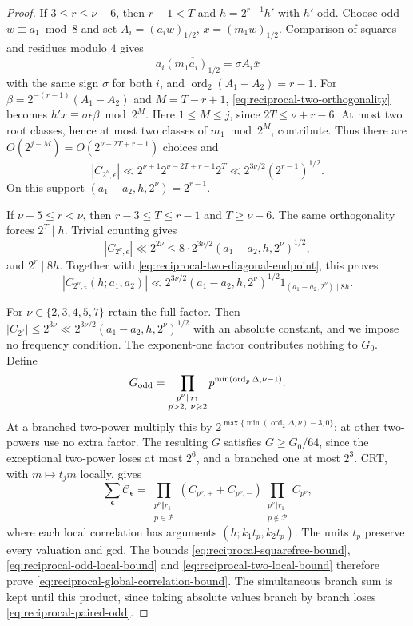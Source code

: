 \documentclass[12pt, a4paper]{amsart}
\numberwithin{equation}{section}
\renewcommand{\bar}[1]{\overline{#1}}
\renewcommand{\le}{\leqslant}
\renewcommand{\ge}{\geqslant}
\theoremstyle{plain}
\begin{document}
\begin{proof}
 If $3\le r\le\nu-6$, then $r-1<T$ and $h=2^{r-1}h'$ with $h'$ odd. Choose odd $w\equiv a_1\bmod8$ and set $A_i=(a_iw)_{1/2}$, $x=(m_1w)_{1/2}$. Comparison of squares and residues modulo $4$ gives
$$
a_i\overline{(m_1a_i)_{1/2}}=\sigma A_i\bar x
$$
with the same sign $\sigma$ for both $i$, and $\operatorname{ord}_2(A_1-A_2)=r-1$. For $\beta=2^{-(r-1)}(A_1-A_2)$ and $M=T-r+1$, \eqref{eq:reciprocal-two-orthogonality} becomes $h'x\equiv\sigma\epsilon\beta\bmod {2^{M}}$. Here $1\le M\le j$, since $2T\le\nu+r-6$. At most two root classes, hence at most two classes of $m_1\bmod2^{M}$, contribute. Thus there are $O(2^{j-M})=O(2^{\nu-2T+r-1})$ choices and
$$
 |C_{2^\nu,\epsilon}|
 \ll2^{\nu+1}2^{\nu-2T+r-1}2^{T}
 \ll2^{3\nu/2}(2^{r-1})^{1/2}.
$$
On this support $(a_1-a_2,h,2^\nu)=2^{r-1}$.

If $\nu-5\le r<\nu$, then $r-3\le T\le r-1$ and $T\ge\nu-6$. The same orthogonality forces $2^{T}\mid h$. Trivial counting gives
$$
|C_{2^\nu,\epsilon}|\ll2^{2\nu}\le8\cdot2^{3\nu/2}(a_1-a_2,h,2^\nu)^{1/2},
$$
and $2^{r}\mid8h$. Together with \eqref{eq:reciprocal-two-diagonal-endpoint}, this proves
\begin{equation}\label{eq:reciprocal-two-local-bound}
 |C_{2^\nu,\epsilon}(h;a_1,a_2)|
 \ll 2^{3\nu/2}(a_1-a_2,h,2^\nu)^{1/2}
 1_{(a_1-a_2,2^\nu)\mid8h}.
\end{equation}

For $\nu\in\{2,3,4,5,7\}$ retain the full factor. Then $|C_{2^\nu}|\le2^{3\nu}\ll2^{3\nu/2}(a_1-a_2,h,2^\nu)^{1/2}$ with an absolute constant, and we impose no frequency condition. The exponent-one factor contributes nothing to $G_0$. Define
$$
 G_{\rm odd}=\prod_{\substack{p^\nu\Vert r_1\\p>2,\ \nu\ge2}}
 p^{\min(\operatorname{ord}_p\Delta,\nu-1)}.
$$
At a branched two-power multiply this by $2^{\max\{\min(\operatorname{ord}_2\Delta,\nu)-3,0\}}$; at other two-powers use no extra factor. The resulting $G$ satisfies $G\ge G_0/64$, since the exceptional two-power loses at most $2^6$, and a branched one at most $2^3$. CRT, with $m\mapsto t_jm$ locally, gives
\begin{equation}\label{eq:reciprocal-correlation-product}
 \sum_{\boldsymbol\epsilon}
 \mathcal C_{\boldsymbol\epsilon}
 =\prod_{\substack{p^\nu\Vert r_1\\p\in\mathcal P}}
  (C_{p^\nu,+}+C_{p^\nu,-})
  \prod_{\substack{p^\nu\Vert r_1\\p\notin\mathcal P}}
   C_{p^\nu},
\end{equation}
where each local correlation has arguments $(h;k_1t_p,k_2t_p)$. The units $t_p$ preserve every valuation and gcd. The bounds \eqref{eq:reciprocal-squarefree-bound}, \eqref{eq:reciprocal-odd-local-bound} and \eqref{eq:reciprocal-two-local-bound} therefore prove \eqref{eq:reciprocal-global-correlation-bound}. The simultaneous branch sum is kept until this product, since taking absolute values branch by branch loses \eqref{eq:reciprocal-paired-odd}.


\end{proof}
\end{document}
